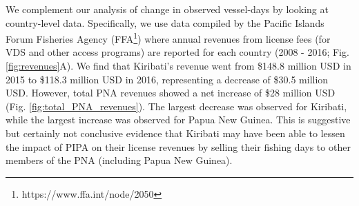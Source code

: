 \documentclass[9p,twocolumn,twoside,lineno]{pnas-new}
\begin{document}
We complement our analysis of change in observed vessel-days by looking at country-level data. Specifically, we use data compiled by the Pacific Islands Forum Fisheries Agency (FFA\footnote{https://www.ffa.int/node/2050}) where annual revenues from license fees (for VDS and other access programs) are reported for each country (2008 - 2016; Fig. \ref{fig:revenues}A). We find that Kiribati's revenue went from \$148.8 million USD in 2015 to \$118.3 million USD in 2016, representing a decrease of \$30.5 million USD. However, total PNA revenues showed a net increase of \$28 million USD (Fig. \ref{fig:total_PNA_revenues}). The largest decrease was observed for Kiribati, while the largest increase was observed for Papua New Guinea. This is suggestive but certainly not conclusive evidence that Kiribati may have been able to lessen the impact of PIPA on their license revenues by selling their fishing days to other members of the PNA (including Papua New Guinea).
\end{document}
